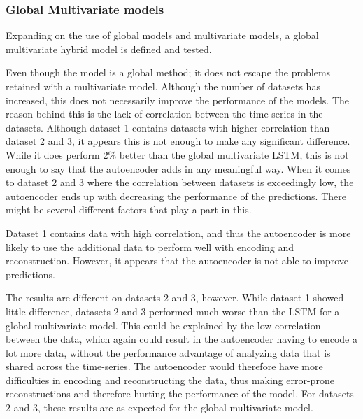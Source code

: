 \subsubsection{Global Multivariate models}

Expanding on the use of global models and multivariate models,
a global multivariate hybrid model is defined and tested.

Even though the model is a global method; it does not escape the problems retained with a multivariate model.
Although the number of datasets has increased, this does not necessarily improve the performance of the models.
The reason behind this is the lack of correlation between the time-series in the datasets.
Although dataset 1 contains datasets with higher correlation than dataset 2 and 3, it appears this is not enough to make any significant difference.
While it does perform 2\% better than the global multivariate LSTM, this is not enough to say that the autoencoder adds
in any meaningful way.
When it comes to dataset 2 and 3 where the correlation between datasets is exceedingly low, the autoencoder ends up with decreasing the performance of the predictions.
There might be several different factors that play a part in this.

Dataset 1 contains data with high correlation, and thus the autoencoder is more likely to use the additional data to perform well with encoding and reconstruction.
However, it appears that the autoencoder is not able to improve predictions.


The results are different on datasets 2 and 3, however.
While dataset 1 showed little difference, datasets 2 and 3 performed much worse than the LSTM for a global multivariate model.
This could be explained by the low correlation between the data, which again could result in the autoencoder having to encode a lot more data,
without the performance advantage of analyzing data that is shared across the time-series.
The autoencoder would therefore have more difficulties in encoding and reconstructing the data,
thus making error-prone reconstructions and therefore hurting the performance of the model.
For datasets 2 and 3, these results are as expected for the global multivariate model.





